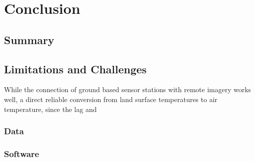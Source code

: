 \documentclass[12pt,a4paper, english]{article}
\begin{document}
%
%
\newpage
\section{Conclusion}\label{sec:conclusion}
\subsection{Summary}

\subsection{Limitations and Challenges}
While the connection of ground based sensor stations with remote imagery works well, a direct reliable conversion from land surface temperatures to air temperature, since the lag and 

\subsubsection{Data}
\subsubsection{Software}
\end{document}
